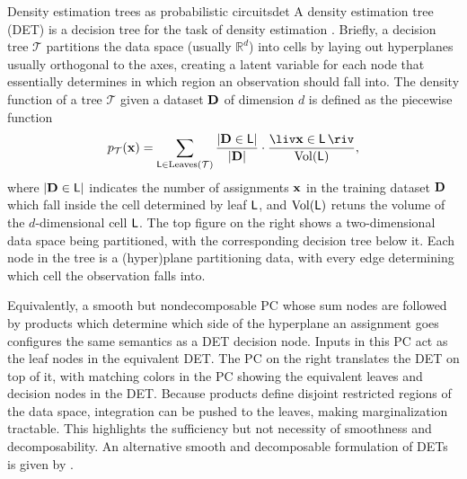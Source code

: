 \begin{example}[sidebyside,lefthand width=0.55\textwidth]{Density estimation trees as probabilistic circuits}{det}
  A density estimation tree (DET) is a decision tree for the task of density estimation
  \citep{ram11}. Briefly, a decision tree $\mathcal{T}$ partitions the data space (usually
  $\mathbb{R}^d$) into cells by laying out hyperplanes usually orthogonal to the axes, creating a
  latent variable for each node that essentially determines in which region an observation should
  fall into. The density function of a tree $\mathcal{T}$ given a dataset $\mathbf{D}$ of dimension
  $d$ is defined as the piecewise function
  \begin{equation}
    p_\mathcal{T}(\set{x})=\sum_{\Leaf\in\operatorname{Leaves}(\mathcal{T})}\frac{\left|\set{D}\in\Leaf\right|}{|\set{D}|}\cdot\frac{\liv\set{x}\in\Leaf\riv}{\operatorname{Vol}(\Leaf)},
  \end{equation}
  where $\left|\mathbf{D}\in\operatorname{\textup{\textsf{L}}}\right|$ indicates the number of assignments $\mathbf{x}$ in the
  training dataset $\mathbf{D}$ which fall inside the cell determined by leaf $\operatorname{\textup{\textsf{L}}}$, and
  $\operatorname{Vol}(\operatorname{\textup{\textsf{L}}})$ retuns the volume of the $d$-dimensional cell $\operatorname{\textup{\textsf{L}}}$. The top figure
  on the right shows a two-dimensional data space being partitioned, with the corresponding
  decision tree below it. Each node in the tree is a (hyper)plane partitioning data, with every
  edge determining which cell the observation falls into.

  Equivalently, a smooth but nondecomposable PC whose sum nodes are followed by products which
  determine which side of the hyperplane an assignment goes configures the same semantics as a DET
  decision node. Inputs in this PC act as the leaf nodes in the equivalent DET. The PC on the right
  translates the DET on top of it, with matching colors in the PC showing the equivalent leaves and
  decision nodes in the DET. Because products define disjoint restricted regions of the data space,
  integration can be pushed to the leaves, making marginalization tractable. This highlights the
  sufficiency but not necessity of smoothness and decomposability. An alternative smooth and
  decomposable formulation of DETs is given by \citet{correia20}.
  \tcblower
  \centering
\end{example}
